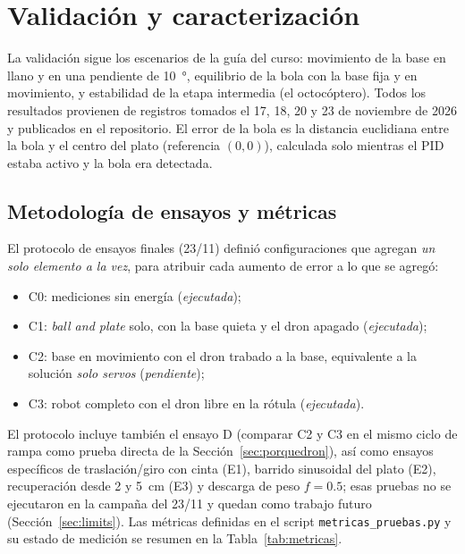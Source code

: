 \section{Validación y caracterización}
\label{sec:validation}

La validación sigue los escenarios de la guía del curso: movimiento de la base en llano y en una pendiente de \SI{10}{\degree}, equilibrio de la bola con la base fija y en movimiento, y estabilidad de la etapa intermedia (el octocóptero). Todos los resultados provienen de registros tomados el 17, 18, 20 y 23 de noviembre de 2026 y publicados en el repositorio. El error de la bola es la distancia euclidiana entre la bola y el centro del plato (referencia $(0,0)$), calculada solo mientras el PID estaba activo y la bola era detectada.

\subsection{Metodología de ensayos y métricas}
\label{sec:metodologia}
El protocolo de ensayos finales (23/11) definió configuraciones que agregan \emph{un solo elemento a la vez}, para atribuir cada aumento de error a lo que se agregó:
\begin{itemize}
  \item C0: mediciones sin energía (\emph{ejecutada});
  \item C1: \textit{ball and plate} solo, con la base quieta y el dron apagado (\emph{ejecutada});
  \item C2: base en movimiento con el dron trabado a la base, equivalente a la solución \emph{solo servos} (\emph{pendiente});
  \item C3: robot completo con el dron libre en la rótula (\emph{ejecutada}).
\end{itemize}
El protocolo incluye también el ensayo D (comparar C2 y C3 en el mismo ciclo de rampa como prueba directa de la Sección~\ref{sec:porquedron}), así como ensayos específicos de traslación/giro con cinta (E1), barrido sinusoidal del plato (E2), recuperación desde 2 y \SI{5}{\centi\metre} (E3) y descarga de peso $f=0.5$; esas pruebas no se ejecutaron en la campaña del 23/11 y quedan como trabajo futuro (Sección~\ref{sec:limits}). Las métricas definidas en el script \texttt{metricas\_pruebas.py} y su estado de medición se resumen en la Tabla~\ref{tab:metricas}.

